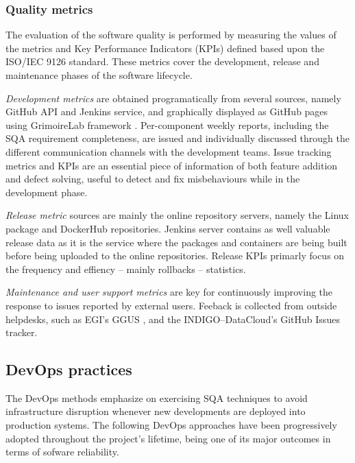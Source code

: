 \documentclass[journal]{IEEEtran}
\begin{document}
\subsubsection{Quality metrics}

The evaluation of the software quality is performed by measuring the values of
the metrics and Key Performance Indicators (KPIs) defined based upon the
ISO/IEC 9126 standard. These metrics cover the development, release and
maintenance phases of the software lifecycle. 

\textit{Development metrics} are obtained programatically from several sources, namely GitHub
API and Jenkins service, and graphically displayed as GitHub pages using GrimoireLab
framework \cite{grimoirelab}. Per-component weekly reports, including the SQA requirement
completeness, are issued and individually discussed through the different communication channels
with the development teams. Issue tracking metrics and KPIs are an essential piece of information
of both feature addition and defect solving, useful to detect and fix misbehaviours while in the
development phase. 

\textit{Release metric} sources are mainly the online repository servers, namely the 
Linux package \cite{indigo-pkg-repo} and DockerHub \cite{indigo-dockerhub} repositories. Jenkins 
server contains as well valuable release data as it is the service where the packages
and containers are being built before being uploaded to the online repositories. Release
KPIs primarly focus on the frequency and effiency -- mainly rollbacks -- statistics.

\textit{Maintenance and user support metrics} are key for continuously improving the response
to issues reported by external users. Feeback is collected from outside helpdesks, such as 
EGI's GGUS \cite{ggus}, and the INDIGO--DataCloud's GitHub Issues tracker.

\subsection{DevOps practices}
\label{sec:devops}

The DevOps methods emphasize on exercising SQA techniques to avoid infrastructure
disruption whenever new developments are deployed into production systems. The 
following DevOps approaches have been progressively adopted throughout the project's
lifetime, being one of its major outcomes in terms of sofware reliability.
\end{document}
